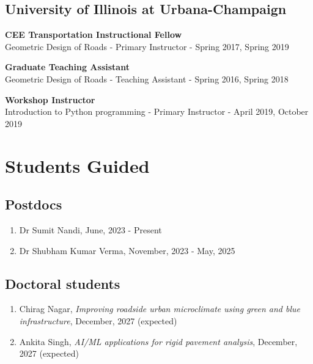 \documentclass[12pt]{article}
\begin{document}
\hfill
\subsection*{University of Illinois at Urbana-Champaign}
\textbf{CEE Transportation Instructional Fellow}\\
Geometric Design of Roads - Primary Instructor - Spring 2017, Spring 2019

\textbf{Graduate Teaching Assistant}\\
Geometric Design of Roads - Teaching Assistant - Spring 2016, Spring 2018

\textbf{Workshop Instructor}\\
Introduction to Python programming - Primary Instructor - April 2019, October 2019

\bigskip
\section*{Students Guided}
\hfill
\subsection*{Postdocs}
\begin{enumerate}
	\item Dr Sumit Nandi, June, 2023 - Present
	\item Dr Shubham Kumar Verma, November, 2023 - May, 2025
\end{enumerate}

\hfill
\subsection*{Doctoral students}
\begin{enumerate}
	\item Chirag Nagar, \textit{Improving roadside urban microclimate using green and blue infrastructure}, December, 2027 (expected)
	\item Ankita Singh, \textit{AI/ML applications for rigid pavement analysis}, December, 2027 (expected)
\end{enumerate}

\hfill
\end{document}
